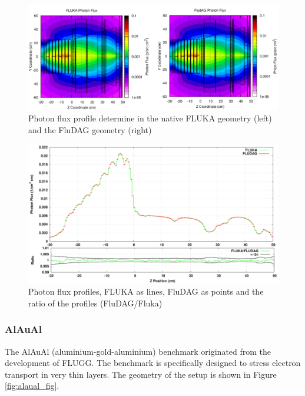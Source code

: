 \begin{figure}[ht!]
 \begin{centering}
 \centering
 \includegraphics[width=0.7\paperwidth]{../figs/atic_photon_flux.png}
 \caption{Photon flux profile determine in the native FLUKA geometry (left) and the FluDAG geometry (right)}
 \label{fig:atic_photon_flux}
 \end{centering}
\end{figure}
\begin{figure}[ht!]
 \begin{centering}
 \centering
 \includegraphics[width=0.7\paperwidth]{../figs/atic_photon_flux_lineout.png}
 \caption{Photon flux profiles, FLUKA as lines, FluDAG as points and the ratio of the profiles (FluDAG/Fluka)}
 \label{fig:atic_photon_flux_lineout}
 \end{centering}
\end{figure}

\clearpage
\subsubsection{AlAuAl}
The AlAuAl (aluminium-gold-aluminium) benchmark originated from the development of FLUGG. The benchmark is 
specifically designed to stress electron transport in very thin layers. The geometry of the setup is shown in
Figure \ref{fig:alaual_fig}.

